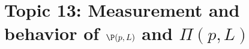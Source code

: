 \newpage
\section{Topic 13: Measurement and behavior of $\P(p, L)$ and $\Pi(p, L)$}\label{sec:topic13}